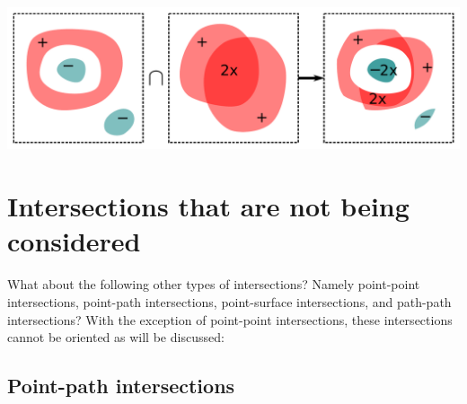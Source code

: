 \documentclass{book}
\begin{document}
\begin{center}
\includegraphics[width = \textwidth]{Intersections/Volume-volume_intersections/volume_volume_intersections_three_panel_example_2}
\end{center}




\section{Intersections that are not being considered}

What about the following other types of intersections? Namely point-point intersections, point-path intersections, point-surface intersections, and path-path intersections? With the exception of point-point intersections, these intersections cannot be oriented as will be discussed: 


\subsection{Point-path intersections}
\end{document}
